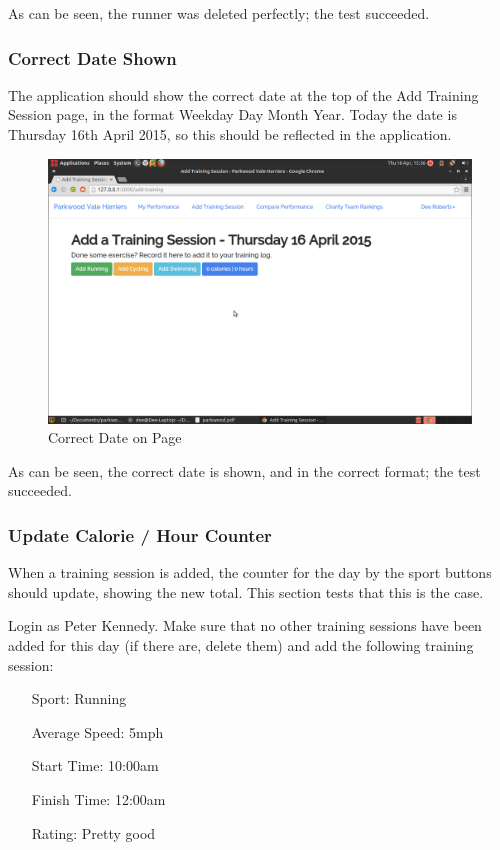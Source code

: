 \documentclass{article}[12pt,a4paper]
\begin{document}
As can be seen, the runner was deleted perfectly; the test succeeded.

\clearpage

\subsubsection{Correct Date Shown}
The application should show the correct date at the top of the Add Training Session page, in the format Weekday Day Month Year. Today the date is Thursday 16th April 2015, so this should be reflected in the application.

\begin{figure}[h!]
    \includegraphics[scale=0.33]{images/testing/add_activity/current_date}
    \caption{Correct Date on Page}
\end{figure}

As can be seen, the correct date is shown, and in the correct format; the test succeeded.

\clearpage

\subsubsection{Update Calorie / Hour Counter}
When a training session is added, the counter for the day by the sport buttons should update, showing the new total. This section tests that this is the case.

Login as Peter Kennedy. Make sure that no other training sessions have been added for this day (if there are, delete them) and add the following training session:

\begin{itemize}
  \item[Sport:] Running
  \item[Average Speed:] 5mph
  \item[Start Time:] 10:00am
  \item[Finish Time:] 12:00am
  \item[Rating:] Pretty good
\end{itemize}
\end{document}
